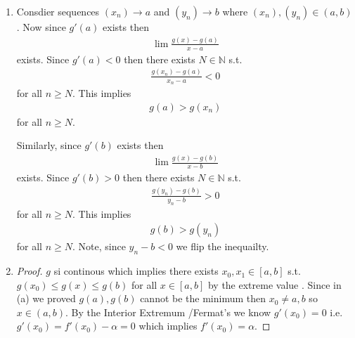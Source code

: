 \begin{enumerate}[label=(\alph*)]
    \item 
    Consdier sequences $(x_n)\rightarrow a$ and $(y_n)\rightarrow b$
    where $(x_n),(y_n)\in (a,b)$.
    Now since $g'(a)$ exists then 
    \begin{align*}
        \lim \frac{g(x)-g(a)}{x-a}
    \end{align*}
    exists. Since  $g'(a)<0$ then there exists $N\in \mathbb{N}$ s.t.
    \begin{align*}
        \frac{g(x_n)-g(a)}{x_n-a} < 0
    \end{align*}
    for all $n\geq N$.
    This implies 
    \begin{align*}
        g(a) > g(x_n)
    \end{align*}
    for all $n\geq N$.

    Similarly, since $g'(b)$ exists then 
    \begin{align*}
        \lim \frac{g(x)-g(b)}{x-b}
    \end{align*}
    exists. Since  $g'(b)>0$ then there exists $N\in \mathbb{N}$ s.t.
    \begin{align*}
        \frac{g(y_n)-g(b)}{y_n-b} > 0
    \end{align*}
    for all $n\geq N$.
    This implies 
    \begin{align*}
        g(b) > g(y_n)
    \end{align*}
    for all $n\geq N$. Note, since $y_n-b<0$ we flip the inequailty.

    \item
    \begin{proof}
        $g$ si continous which implies there exists $x_0,x_1 \in [a,b]$
        s.t. $g(x_0)\leq g(x)\leq g(b)$ for all $x\in [a,b]$ by the 
        extreme value \Thm. Since in (a) we proved $g(a),g(b)$ cannot 
        be the minimum then $x_0\neq a,b$ so $x\in (a,b)$.
        By the Interior Extremum \Thm/Fermat's \Thm we know $g'(x_0)=0$
        i.e. $g'(x_0) = f'(x_0)-\alpha=0$ which implies $f'(x_0)=\alpha$. 
    \end{proof}
\end{enumerate}

